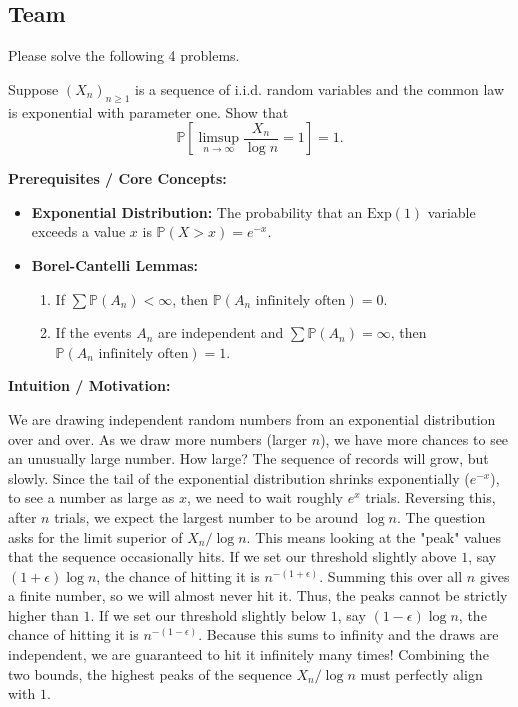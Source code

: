 \subsection{Team}
Please solve the following 4 problems.

\begin{exercise}\label{probability:2019:5}
Suppose $(X_n)_{n \geq 1}$ is a sequence of i.i.d. random variables and the common law is exponential with parameter one. Show that
\[
\mathbb{P}\left[ \limsup_{n \to \infty} \frac{X_n}{\log n} = 1 \right] = 1.
\]
\end{exercise}

\begin{solution}
\textbf{Prerequisites / Core Concepts:}
\begin{itemize}
    \item \textbf{Exponential Distribution:} The probability that an $\text{Exp}(1)$ variable exceeds a value $x$ is $\mathbb{P}(X > x) = e^{-x}$.
    \item \textbf{Borel-Cantelli Lemmas:}
    \begin{enumerate}
        \item If $\sum \mathbb{P}(A_n) < \infty$, then $\mathbb{P}(A_n \text{ infinitely often}) = 0$.
        \item If the events $A_n$ are independent and $\sum \mathbb{P}(A_n) = \infty$, then $\mathbb{P}(A_n \text{ infinitely often}) = 1$.
    \end{enumerate}
\end{itemize}

\textbf{Intuition / Motivation:}

We are drawing independent random numbers from an exponential distribution over and over. As we draw more numbers (larger $n$), we have more chances to see an unusually large number. How large? The sequence of records will grow, but slowly.
Since the tail of the exponential distribution shrinks exponentially ($e^{-x}$), to see a number as large as $x$, we need to wait roughly $e^x$ trials. Reversing this, after $n$ trials, we expect the largest number to be around $\log n$.
The question asks for the limit superior of $X_n / \log n$. This means looking at the "peak" values that the sequence occasionally hits.
If we set our threshold slightly above $1$, say $(1+\epsilon)\log n$, the chance of hitting it is $n^{-(1+\epsilon)}$. Summing this over all $n$ gives a finite number, so we will almost never hit it. Thus, the peaks cannot be strictly higher than $1$.
If we set our threshold slightly below $1$, say $(1-\epsilon)\log n$, the chance of hitting it is $n^{-(1-\epsilon)}$. Because this sums to infinity and the draws are independent, we are guaranteed to hit it infinitely many times!
Combining the two bounds, the highest peaks of the sequence $X_n / \log n$ must perfectly align with $1$.


\end{solution}
